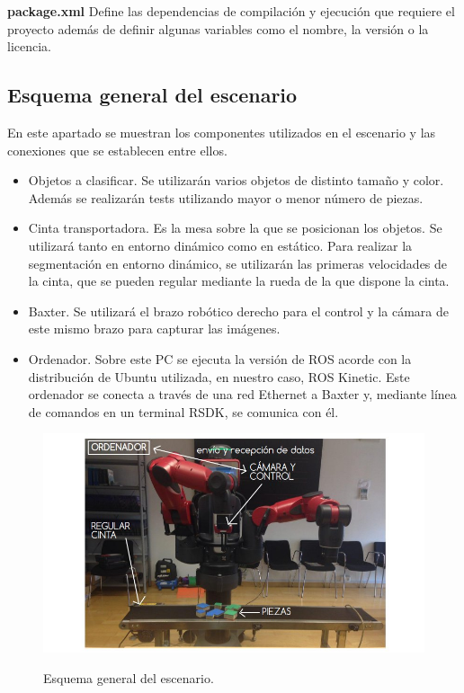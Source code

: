 \textbf{package.xml} Define las dependencias de compilación y ejecución que requiere el proyecto además de definir algunas variables como el nombre, la versión o la licencia. \\

\subsection{Esquema general del escenario}
\noindent En este apartado se muestran los componentes utilizados en el escenario y las conexiones que se establecen entre ellos. \\

\begin{itemize}
	\item Objetos a clasificar. Se utilizarán varios objetos de distinto tamaño y color. Además se realizarán tests utilizando mayor o menor número de piezas. \\
	\item Cinta transportadora. Es la mesa sobre la que se posicionan los objetos. Se utilizará tanto en entorno dinámico como en estático. Para realizar la segmentación en entorno dinámico, se utilizarán las primeras velocidades de la cinta, que se pueden regular mediante la rueda de la que dispone la cinta. \\
	\item Baxter. Se utilizará el brazo robótico derecho para el control y la cámara de este mismo brazo para capturar las imágenes.\\
	\item Ordenador. Sobre este PC se ejecuta la versión de ROS acorde con la distribución de Ubuntu utilizada, en nuestro caso, ROS Kinetic. Este ordenador se conecta a través de una red Ethernet a Baxter y, mediante línea de comandos en un terminal RSDK, se comunica con él. \\
	
\end{itemize}

\begin{figure}[H]
	\centering %
	\label{fig:esquema}
	\includegraphics[scale=0.45]{imagenes/esquema.jpg}
	\caption{Esquema general del escenario.}
\end{figure}

